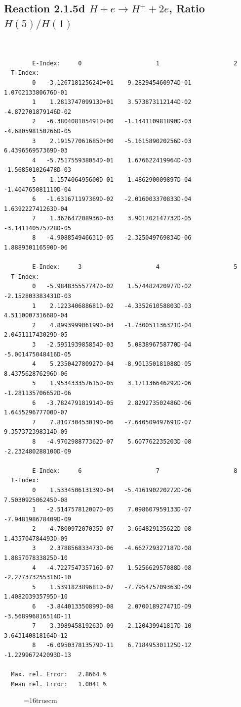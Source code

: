 \documentclass[12pt,dvips]{article}
\begin{document}
\newpage
\subsection{
Reaction 2.1.5d  $H + e \rightarrow H^+ + 2e$, Ratio $H(5)/H(1)$
}


\begin{small}\begin{verbatim}


        E-Index:     0                     1                     2
  T-Index:
        0   -3.126718125624D+01    9.282945460974D-01    1.070213380676D-01
        1    1.281374709913D+01    3.573873112144D-02   -4.872701879146D-02
        2   -6.380408105491D+00   -1.144110981890D-03   -4.680598150266D-05
        3    2.191577061685D+00   -5.161589020256D-03    6.439656957369D-03
        4   -5.751755938054D-01    1.676622419964D-03   -1.568501026478D-03
        5    1.157406495600D-01    1.486290009897D-04   -1.404765081110D-04
        6   -1.631671197369D-02   -2.016003370833D-04    1.639222741263D-04
        7    1.362647208936D-03    3.901702147732D-05   -3.141140575728D-05
        8   -4.908854946631D-05   -2.325049769834D-06    1.888930116590D-06

        E-Index:     3                     4                     5
  T-Index:
        0   -5.984835557747D-02    1.574482420977D-02   -2.152803383431D-03
        1    2.122340688681D-02   -4.335261058803D-03    4.511000731668D-04
        2    4.899399906199D-04   -1.730051136321D-04    2.045111743029D-05
        3   -2.595193985854D-03    5.083896758770D-04   -5.001475048416D-05
        4    5.235042780927D-04   -8.901350181088D-05    8.437562876296D-06
        5    1.953433357615D-05    3.171136646292D-06   -1.281135706652D-06
        6   -3.782479181914D-05    2.829273502486D-06    1.645529677700D-07
        7    7.810730453019D-06   -7.640509497691D-07    9.357372398314D-09
        8   -4.970298877362D-07    5.607762235203D-08   -2.232480288100D-09

        E-Index:     6                     7                     8
  T-Index:
        0    1.533450613139D-04   -5.416190220272D-06    7.503092506245D-08
        1   -2.514757812007D-05    7.098607959133D-07   -7.948198678409D-09
        2   -4.780097207035D-07   -3.664829135622D-08    1.435704784493D-09
        3    2.378856833473D-06   -4.662729327187D-08    1.885707833825D-10
        4   -4.722754735716D-07    1.525662957088D-08   -2.277373255316D-10
        5    1.539182389681D-07   -7.795475709363D-09    1.408203935795D-10
        6   -3.844013350899D-08    2.070018927471D-09   -3.568996816514D-11
        7    3.398945819263D-09   -2.120439941817D-10    3.643140818164D-12
        8   -6.095037813579D-11    6.718495301125D-12   -1.229967242093D-13

  Max. rel. Error:   2.8664 %
  Mean rel. Error:   1.0041 %

\end{verbatim}\end{small}
\begin{figure} \label{2.1.5d}
\epsfxsize=16truecm
\end{figure}
\end{document}
